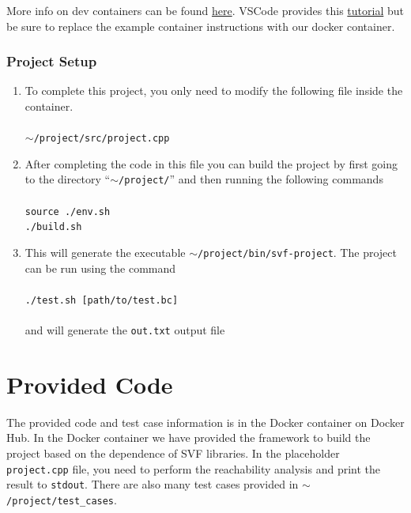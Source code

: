 \documentclass[12pt]{article}
\newcommand{\codeIn}[1]{{\small\tt{#1}}}
\newcommand{\implementationFile}{\codeIn{project.cpp} }
\begin{document}
\begin{enumerate}
    More info on dev containers can be found \href{https://code.visualstudio.com/docs/devcontainers/containers}{here}. VSCode provides this \href{https://code.visualstudio.com/docs/devcontainers/tutorial}{tutorial} but be sure to replace the example container instructions with our docker container.
    
\end{enumerate}

\subsubsection{Project Setup}
\begin{enumerate}
    \item To complete this project, you only need to modify the following file inside the container.\\\\
    \codeIn{$\sim$/project/src/project.cpp}\\
    
    \item After completing the code in this file you can build the project by first going to the directory ``\codeIn{$\sim$/project/}'' and then running the following commands\\\\
    \codeIn{source ./env.sh}\\
    \codeIn{./build.sh}\\

    \item This will generate the executable \codeIn{$\sim$/project/bin/svf-project}. The project can be run using the command\\\\    
    \codeIn{./test.sh [path/to/test.bc]}\\\\
    and will generate the \codeIn{out.txt} output file
    

\end{enumerate}
\section{Provided Code}

The provided code and test case information is in the Docker container on Docker Hub. In the Docker container we have provided the framework to build the project based on the dependence of SVF libraries. In the placeholder \implementationFile file, you need to perform the reachability analysis and print the result to \codeIn{stdout}. There are also many test cases provided in \codeIn{$\sim$/project/test\_cases}.
\end{document}
